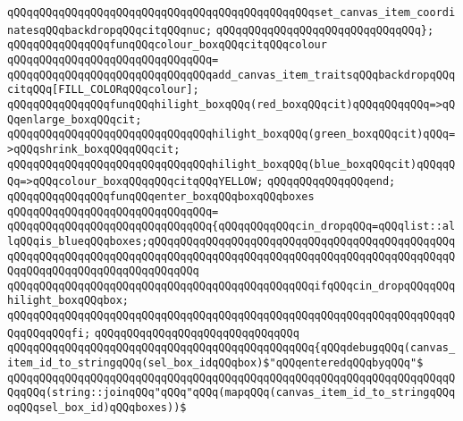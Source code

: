 \verb|qQQqqQQqqQQqqQQqqQQqqQQqqQQqqQQqqQQqqQQqqQQqqQQqset_canvas_item_coordinatesqQQqbackdropqQQqcitqQQqnuc;|\newline
\verb|qQQqqQQqqQQqqQQqqQQqqQQqqQQqqQQq};|\newline
\newline
\verb|qQQqqQQqqQQqqQQqfunqQQqcolour_boxqQQqcitqQQqcolour|\newline
\verb|qQQqqQQqqQQqqQQqqQQqqQQqqQQqqQQq=|\newline
\verb|qQQqqQQqqQQqqQQqqQQqqQQqqQQqqQQqadd_canvas_item_traitsqQQqbackdropqQQqcitqQQq[FILL_COLORqQQqcolour];|\newline
\newline
\verb|qQQqqQQqqQQqqQQqfunqQQqhilight_boxqQQq(red_boxqQQqcit)qQQqqQQqqQQq=>qQQqenlarge_boxqQQqcit;|\newline
\verb|qQQqqQQqqQQqqQQqqQQqqQQqqQQqqQQqhilight_boxqQQq(green_boxqQQqcit)qQQq=>qQQqshrink_boxqQQqqQQqcit;|\newline
\verb|qQQqqQQqqQQqqQQqqQQqqQQqqQQqqQQqhilight_boxqQQq(blue_boxqQQqcit)qQQqqQQq=>qQQqcolour_boxqQQqqQQqcitqQQqYELLOW;|\newline
\verb|qQQqqQQqqQQqqQQqend;|\newline
\newline
\verb|qQQqqQQqqQQqqQQqfunqQQqenter_boxqQQqboxqQQqboxes|\newline
\verb|qQQqqQQqqQQqqQQqqQQqqQQqqQQqqQQq=|\newline
\verb|qQQqqQQqqQQqqQQqqQQqqQQqqQQqqQQq{qQQqqQQqqQQqcin_dropqQQq=qQQqlist::allqQQqis_blueqQQqboxes;qQQqqQQqqQQqqQQqqQQqqQQqqQQqqQQqqQQqqQQqqQQqqQQqqQQqqQQqqQQqqQQqqQQqqQQqqQQqqQQqqQQqqQQqqQQqqQQqqQQqqQQqqQQqqQQqqQQqqQQqqQQqqQQqqQQqqQQqqQQqqQQqqQQq|\newline
\newline
\verb|qQQqqQQqqQQqqQQqqQQqqQQqqQQqqQQqqQQqqQQqqQQqqQQqifqQQqcin_dropqQQqqQQqhilight_boxqQQqbox;|\newline
\verb|qQQqqQQqqQQqqQQqqQQqqQQqqQQqqQQqqQQqqQQqqQQqqQQqqQQqqQQqqQQqqQQqqQQqqQQqqQQqqQQqfi;|\newline
\verb|qQQqqQQqqQQqqQQqqQQqqQQqqQQqqQQq|\newline
\verb|qQQqqQQqqQQqqQQqqQQqqQQqqQQqqQQqqQQqqQQqqQQqqQQq{qQQqdebugqQQq(canvas_item_id_to_stringqQQq(sel_box_idqQQqbox)$"qQQqenteredqQQqbyqQQq"$|\newline
\verb|qQQqqQQqqQQqqQQqqQQqqQQqqQQqqQQqqQQqqQQqqQQqqQQqqQQqqQQqqQQqqQQqqQQqqQQqqQQq(string::joinqQQq"qQQq"qQQq(mapqQQq(canvas_item_id_to_stringqQQqoqQQqsel_box_id)qQQqboxes))$|\newline
